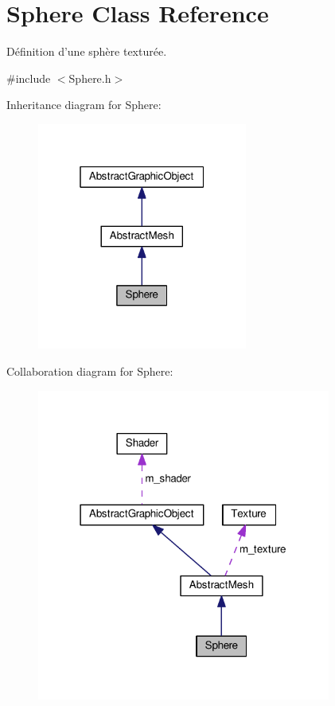 \hypertarget{classSphere}{\section{Sphere Class Reference}
\label{classSphere}
}


Définition d'une sphère texturée.  




{\ttfamily \#include $<$Sphere.\+h$>$}



Inheritance diagram for Sphere\+:\nopagebreak
\begin{figure}[H]
\begin{center}
\leavevmode
\includegraphics[width=196pt]{classSphere__inherit__graph}
\end{center}
\end{figure}


Collaboration diagram for Sphere\+:\nopagebreak
\begin{figure}[H]
\begin{center}
\leavevmode
\includegraphics[width=274pt]{classSphere__coll__graph}
\end{center}
\end{figure}
